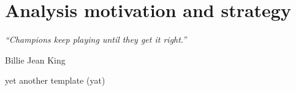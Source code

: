 \chapter{Analysis motivation and strategy}
\label{ch:motivation_strategy}
\epigraph{\emph{“Champions keep playing until they get it right.”}}{Billie Jean King}

yet another template (yat)